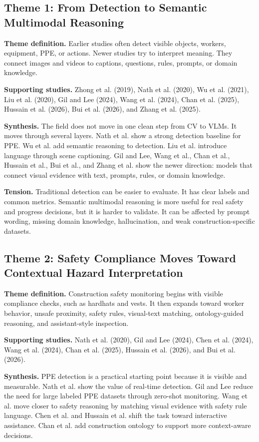 \documentclass[10pt, letterpaper]{article}
\begin{document}
\subsection{Theme 1: From Detection to Semantic Multimodal Reasoning}

\textbf{Theme definition.} Earlier studies often detect visible objects, workers, equipment, PPE, or actions. Newer studies try to interpret meaning. They connect images and videos to captions, questions, rules, prompts, or domain knowledge.

\textbf{Supporting studies.} Zhong et al. (2019), Nath et al. (2020), Wu et al. (2021), Liu et al. (2020), Gil and Lee (2024), Wang et al. (2024), Chan et al. (2025), Hussain et al. (2026), Bui et al. (2026), and Zhang et al. (2025).

\textbf{Synthesis.} The field does not move in one clean step from CV to VLMs. It moves through several layers. Nath et al. show a strong detection baseline for PPE. Wu et al. add semantic reasoning to detection. Liu et al. introduce language through scene captioning. Gil and Lee, Wang et al., Chan et al., Hussain et al., Bui et al., and Zhang et al. show the newer direction: models that connect visual evidence with text, prompts, rules, or domain knowledge.

\textbf{Tension.} Traditional detection can be easier to evaluate. It has clear labels and common metrics. Semantic multimodal reasoning is more useful for real safety and progress decisions, but it is harder to validate. It can be affected by prompt wording, missing domain knowledge, hallucination, and weak construction-specific datasets.

\subsection{Theme 2: Safety Compliance Moves Toward Contextual Hazard Interpretation}

\textbf{Theme definition.} Construction safety monitoring begins with visible compliance checks, such as hardhats and vests. It then expands toward worker behavior, unsafe proximity, safety rules, visual-text matching, ontology-guided reasoning, and assistant-style inspection.

\textbf{Supporting studies.} Nath et al. (2020), Gil and Lee (2024), Chen et al. (2024), Wang et al. (2024), Chan et al. (2025), Hussain et al. (2026), and Bui et al. (2026).

\textbf{Synthesis.} PPE detection is a practical starting point because it is visible and measurable. Nath et al. show the value of real-time detection. Gil and Lee reduce the need for large labeled PPE datasets through zero-shot monitoring. Wang et al. move closer to safety reasoning by matching visual evidence with safety rule language. Chen et al. and Hussain et al. shift the task toward interactive assistance. Chan et al. add construction ontology to support more context-aware decisions.
\end{document}
